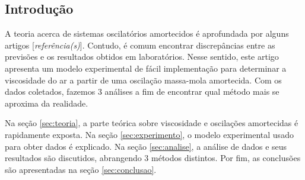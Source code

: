 \documentclass[a4paper, 12pt]{article}
\begin{document}
	\begin{multicols}{2}
		\setlength{\parindent}{4ex}
		\section{Introdução}
			A teoria acerca de sistemas oscilatórios amortecidos é aprofundada por alguns artigos [\textit{referência(s)}]. Contudo, é comum encontrar discrepâncias entre as previsões e os resultados obtidos em laboratórios. Nesse sentido, este artigo apresenta um modelo experimental de fácil implementação para determinar a viscosidade do ar a partir de uma oscilação massa-mola amortecida. Com os dados coletados, fazemos 3 análises a fim de encontrar qual método mais se aproxima da realidade.
			\par Na seção \hyperref[sec:teoria]{\ref{sec:teoria}}, a parte teórica sobre viscosidade e oscilações amortecidas é rapidamente exposta. Na seção \hyperref[sec:experimento]{\ref{sec:experimento}}, o modelo experimental usado para obter dados é explicado. Na seção \hyperref[sec:analise]{\ref{sec:analise}}, a análise de dados e seus resultados são discutidos, abrangendo 3 métodos distintos. Por fim, as conclusões são apresentadas na seção \hyperref[sec:conclusao]{\ref{sec:conclusao}}.
			

\end{multicols}
\end{document}
